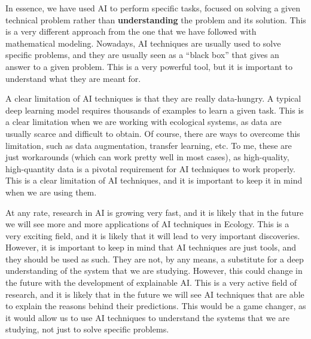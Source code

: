 In
essence, we have used AI to perform specific tasks, focused on solving a given
technical problem rather than \textbf{understanding} the problem and its
solution. This is a very different approach from the one that we have followed
with mathematical modeling. Nowadays, AI techniques are usually used to solve
specific problems, and they are usually seen as a ``black box'' that gives an
answer to a given problem. This is a very powerful tool, but it is important to
understand what they are meant for.

A clear limitation of AI techniques is that they are really data-hungry. A
typical deep learning model requires thousands of examples to learn a given
task. This is a clear limitation when we are working with ecological systems,
as data are usually scarce and difficult to obtain. Of course, there are ways
to overcome this limitation, such as data augmentation, transfer learning,
etc. To me, these are just workarounds (which can work pretty well in most
cases), as high-quality, high-quantity data is a pivotal requirement for AI
techniques to work properly. This is a clear limitation of AI techniques, and
it is important to keep it in mind when we are using them.

At any rate, research in AI is growing very fast, and it is likely that in the
future we will see more and more applications of AI techniques in Ecology. This
is a very exciting field, and it is likely that it will lead to very important
discoveries. However, it is important to keep in mind that AI techniques are
just tools, and they should be used as such. They are not, by any means, a
substitute for a deep understanding of the system that we are studying.
However, this could change in the future with the development of explainable
AI. This is a very active field of research, and it is likely that in the
future we will see AI techniques that are able to explain the reasons behind
their predictions. This would be a game changer, as it would allow us to use AI
techniques to understand the systems that we are studying, not just to solve
specific problems.

